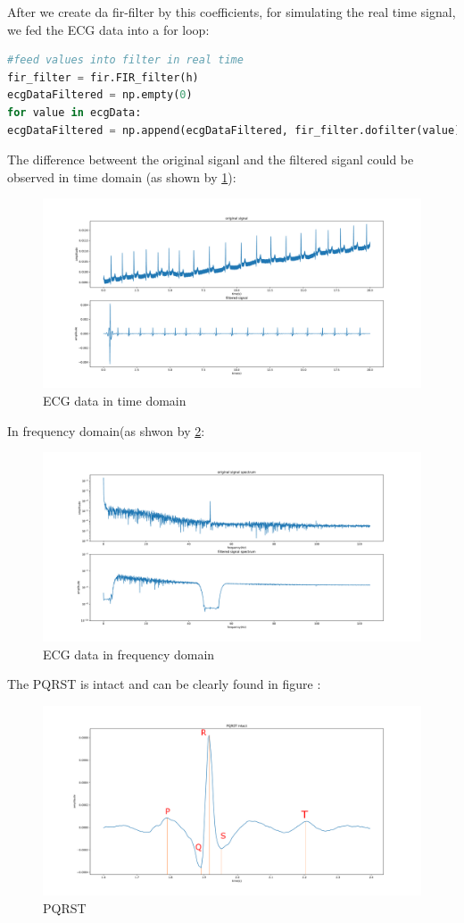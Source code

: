 \documentclass[a4paper,12pt]{article}
\begin{document}
After we create da fir-filter by this coefficients, for simulating the real time signal, we fed the ECG data into a for loop: 
\begin{lstlisting}[language=Python]
#feed values into filter in real time
fir_filter = fir.FIR_filter(h)
ecgDataFiltered = np.empty(0)
for value in ecgData:
ecgDataFiltered = np.append(ecgDataFiltered, fir_filter.dofilter(value))
\end{lstlisting}
The difference betweent the original siganl and the filtered siganl could be observed in time domain (as shown by \ref{fig_ecgTime}): 
\begin{figure}[H]   
	\centering 
	\includegraphics[width=12cm]{../Figures/ecgDataTime.pdf} 
	\caption{ECG data in time domain}   
	\label{fig_ecgTime}
\end{figure}
In frequency domain(as shwon by \ref{fig_ecgFrequency}: 
\begin{figure}[H]   
	\centering 
	\includegraphics[width=12cm]{../Figures/ecgDataFrequency.pdf} 
	\caption{ECG data in frequency domain}   
	\label{fig_ecgFrequency}
\end{figure}
The PQRST is intact and can be clearly found in figure :
\begin{figure}[H]   
	\centering 
	\includegraphics[width=12cm]{../Figures/PQRST.pdf} 
	\caption{PQRST}   
	\label{fig_PQRST}
\end{figure}
\end{document}
